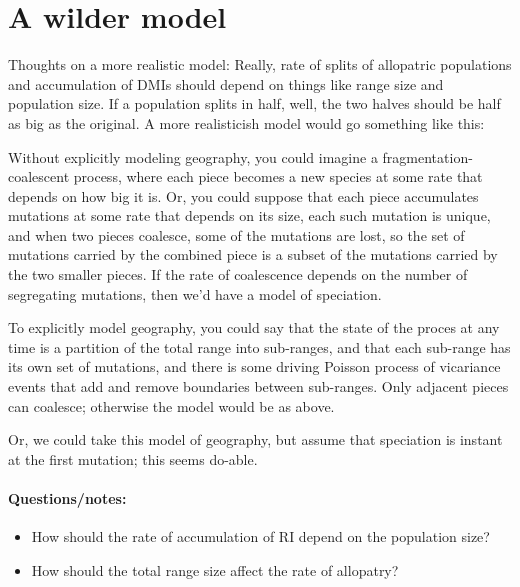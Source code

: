 \documentclass{article}
\begin{document}
\section{A wilder model}

Thoughts on a more realistic model:
Really, rate of splits of allopatric populations and accumulation of DMIs should depend on things like range size and population size.
If a population splits in half, well, the two halves should be half as big as the original.
A more realisticish model would go something like this:

Without explicitly modeling geography, you could imagine a fragmentation-coalescent process, 
where each piece becomes a new species at some rate that depends on how big it is.
Or, you could suppose that each piece accumulates mutations at some rate that depends on its size,
each such mutation is unique,
and when two pieces coalesce, some of the mutations are lost, so the set of mutations carried by the combined piece
is a subset of the mutations carried by the two smaller pieces.
If the rate of coalescence depends on the number of segregating mutations,
then we'd have a model of speciation.

To explicitly model geography, you could say that the state of the proces at any time
is a partition of the total range into sub-ranges,
and that each sub-range has its own set of mutations,
and there is some driving Poisson process of vicariance events that add and remove boundaries between sub-ranges.
Only adjacent pieces can coalesce; otherwise the model would be as above.

Or, we could take this model of geography,
but assume that speciation is instant at the first mutation;
this seems do-able.

\paragraph{Questions/notes:}
\begin{itemize}
  \item How should the rate of accumulation of RI depend on the population size?
  \item How should the total range size affect the rate of allopatry?
\end{itemize}
\end{document}

